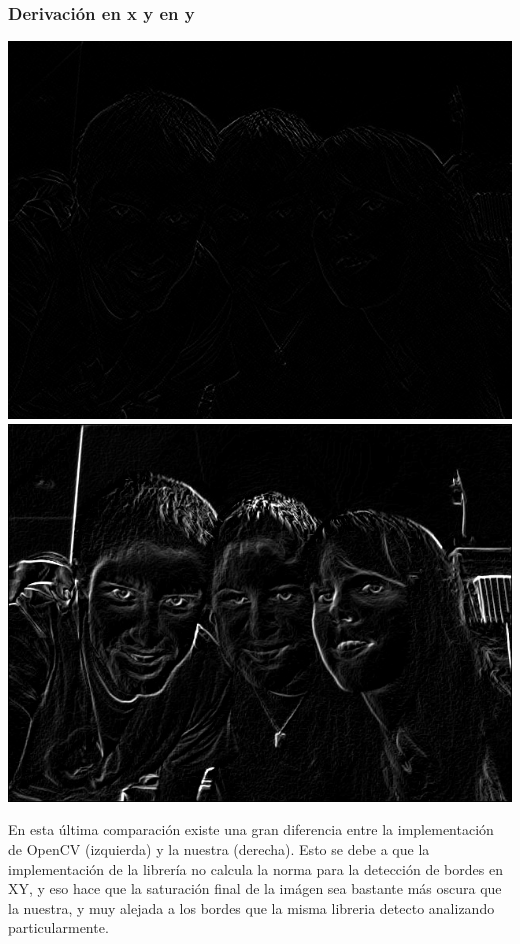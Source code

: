 \documentclass[a4paper, 10pt]{article}
\begin{document}
\subsubsection{Derivaci\'on en x y en y}
\begin{center}
	\includegraphics[scale=0.30]{Graficos/out/cvSobelXY_foto3.jpg}
	\includegraphics[scale=0.30]{Graficos/out/sobelXY_foto3.jpg}
\end{center}

En esta \'ultima comparaci\'on existe una gran diferencia entre la implementaci\'on de OpenCV (izquierda) y la nuestra (derecha).
Esto se debe a que la implementaci\'on de la librer\'ia no calcula la norma para la detecci\'on de bordes en XY, y eso hace que la saturaci\'on final de la im\'agen sea bastante m\'as oscura que la nuestra, y muy alejada a los bordes que la misma libreria detecto analizando particularmente.
\end{document}
